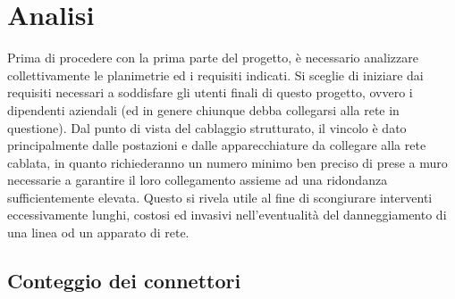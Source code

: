 %

\section{Analisi}
Prima di procedere con la prima parte del progetto, è necessario analizzare collettivamente
le planimetrie ed i requisiti indicati. Si sceglie di iniziare dai requisiti necessari a soddisfare
gli utenti finali di questo progetto, ovvero i dipendenti aziendali (ed in genere chiunque debba collegarsi
alla rete in questione). Dal punto di vista del cablaggio strutturato, il vincolo è dato principalmente dalle
postazioni e dalle apparecchiature da collegare alla rete cablata, in quanto richiederanno un numero minimo
ben preciso di prese a muro necessarie a garantire il loro collegamento assieme ad una ridondanza
sufficientemente elevata. Questo si rivela utile al fine di scongiurare interventi eccessivamente lunghi,
costosi ed invasivi nell'eventualità del danneggiamento di una linea od un apparato di rete.

\subsection{Conteggio dei connettori}